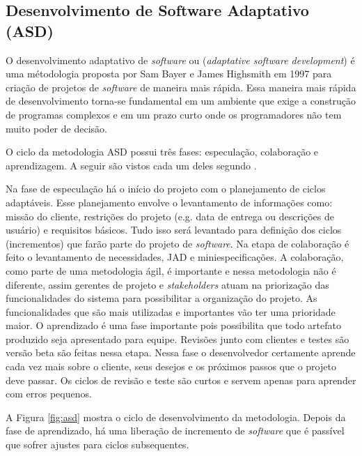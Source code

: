 \subsection{Desenvolvimento de Software Adaptativo (ASD)}
 
O desenvolvimento adaptativo de \textit{software} ou (\textit{adaptative software development}) é uma métodologia proposta por Sam Bayer e James Highsmith em 1997 para criação de projetos de \textit{software} de maneira mais rápida. Essa maneira mais rápida de desenvolvimento torna-se fundamental em um ambiente que exige a construção de programas complexos e em um prazo curto onde os programadores não tem muito poder de decisão. \cite{pressman:11} \cite{macedo:12}

O ciclo da metodologia ASD possui três fases: especulação, colaboração e aprendizagem. A seguir são vistos cada um deles segundo \cite{pressman:11}.

Na fase de especulação há o início do projeto com o planejamento de ciclos adaptáveis. Esse planejamento envolve o levantamento de informações como: missão do cliente, restrições do projeto (e.g. data de entrega ou descrições de usuário) e requisitos básicos. Tudo isso será levantado para definição dos ciclos (incrementos) que farão parte do projeto de \textit{software}. Na etapa de colaboração é feito o levantamento de necessidades, JAD e miniespecificações. A colaboração, como parte de uma metodologia ágil, é importante e nessa metodologia não é diferente, assim gerentes de projeto e \textit{stakeholders} atuam na priorização das funcionalidades do sistema para possibilitar a organização do projeto. As funcionalidades que são mais utilizadas e importantes vão ter uma prioridade maior. O aprendizado é uma fase importante pois possibilita que todo artefato produzido seja apresentado para equipe. Revisões junto com clientes e testes são versão beta são feitas nessa etapa. Nessa fase o desenvolvedor certamente aprende cada vez mais sobre o cliente, seus desejos e os próximos passos que o projeto deve passar. Os ciclos de revisão e teste são curtos e servem apenas para aprender com erros pequenos. \cite{macedo:12} \cite{pressman:11}

A Figura \ref{fig:asd} mostra o ciclo de desenvolvimento da metodologia. Depois da fase de aprendizado, há uma liberação de incremento de \textit{software} que é passível que sofrer ajustes para ciclos subsequentes.

